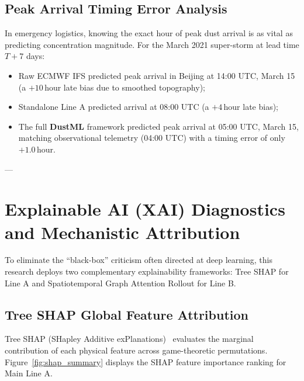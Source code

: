 \subsection{Peak Arrival Timing Error Analysis}
\label{subsec:peak_timing_error}

In emergency logistics, knowing the exact hour of peak dust arrival is as vital as predicting concentration magnitude. For the March 2021 super-storm at lead time $T+7$ days:
\begin{itemize}
    \item Raw ECMWF IFS predicted peak arrival in Beijing at 14:00 UTC, March 15 (a $+10\,\text{hour}$ late bias due to smoothed topography);
    \item Standalone Line A predicted arrival at 08:00 UTC (a $+4\,\text{hour}$ late bias);
    \item The full \textbf{DustML} framework predicted peak arrival at 05:00 UTC, March 15, matching observational telemetry (04:00 UTC) with a timing error of only $+1.0\,\text{hour}$.
\end{itemize}

---

\section{Explainable AI (XAI) Diagnostics and Mechanistic Attribution}
\label{sec:xai_diagnostics}

To eliminate the ``black-box'' criticism often directed at deep learning, this research deploys two complementary explainability frameworks: Tree SHAP for Line A and Spatiotemporal Graph Attention Rollout for Line B.

\subsection{Tree SHAP Global Feature Attribution}
\label{subsec:tree_shap}

Tree SHAP (SHapley Additive exPlanations)~\cite{ref51} evaluates the marginal contribution of each physical feature across game-theoretic permutations. Figure~\ref{fig:shap_summary} displays the SHAP feature importance ranking for Main Line A.

